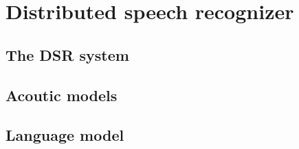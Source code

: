 \chapter{Distributed speech recognizer}\label{ch:distributed_speech_recognizer}

\section{The DSR system}

\section{Acoutic models}

\section{Language model}

